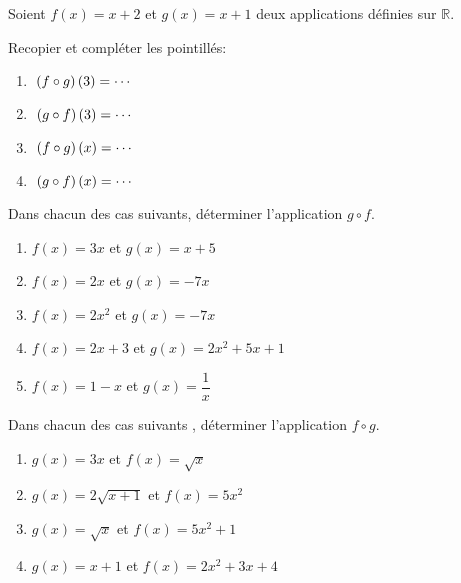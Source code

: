 



	\begin{exercice}
	 Soient  $ f(x)=x+2$ et $ g(x)=x+1$ deux applications définies sur $ \mathbb{R} $.
	 
Recopier et compléter  les pointillés:
\begin{enumerate}
\item
 $\; \left(f \circ g\right)(3)=\cdots$
\item
$\;\left(g \circ f\right)(3) =\cdots\hspace*{1cm}$ 
\item 
$\;\left(f \circ g\right)(x) =\cdots$
\item 
$\;\left(g \circ f\right)(x) =\cdots$
\end{enumerate}
\end{exercice}
\begin{exercice}
Dans chacun des cas suivants, déterminer l'application  $ g\circ f $.

\begin{enumerate}
\item  $ f(x)= 3x $  et $ g(x)=x+5 $


\item  $ f(x)= 2x $  et  $ g(x)=-7x $


\item  $ f(x)= 2x^{2} $  et  $ g(x)=-7x $


\item $ f(x)= 2x+3 $  et $ g(x)=2x^{2}+5x+1 $


\item $ f(x)= 1-x $   et  $ g(x)=\dfrac{1}{x} $

\end{enumerate}

\end{exercice}



\begin{exercice}
 Dans chacun des cas suivants , déterminer l'application  $ f\circ g $.

\begin{enumerate}
\item  $ g(x)= 3x $  et $ f(x)=\sqrt{x} $


\item $ g(x)= 2\sqrt{x+1} $  et  $ f(x)=5x^{2} $


\item $ g(x)= \sqrt{x} $  et  $ f(x)=5x^{2}+1 $


\item $ g(x)= x+1 $  et   $ f(x)=2x^{2} +3x+4$

\end{enumerate}

\end{exercice}


